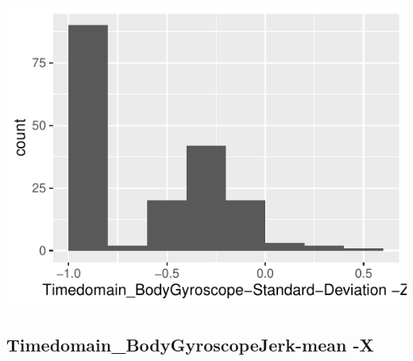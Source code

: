 \documentclass[
]{article}
\begin{document}
\begin{minipage}{0.25 \textwidth}

\includegraphics{codebook_tidydatasub_files/figure-latex/Var-26-Timedomain-BodyGyroscope-Standard-Deviation--Z-1.pdf}

\end{minipage}

\noindent\makebox[\linewidth]{\rule{\textwidth}{0.4pt}}

\hypertarget{timedomain_bodygyroscopejerk-mean--x}{%
\subsection{Timedomain\_BodyGyroscopeJerk-mean
-X}\label{timedomain_bodygyroscopejerk-mean--x}}
\end{document}
